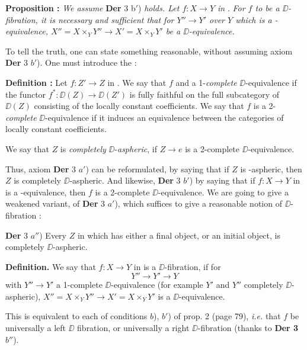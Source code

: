 \textbf{Proposition :} \textit{We assume} \textbf{Der} 3 \textup{b}$'$) \textit{holds. Let $f : X \to Y$ in} \Dia. \textit{For $f$ to be a $\DD$-fibration, it is necessary and sufficient that for $Y'' \to Y'$ over $Y$ which is a} \Hot\textit{-equivalence, $X'' = X \times_Y Y'' \to X' = X \times_Y Y'$ be a $\DD$-equivalence.}

To tell the truth, one can state something reasonable, without assuming axiom \textbf{Der} 3 $b'$). One must introduce the :

\textbf{Definition :} Let $f : Z' \to Z$ in \Dia. We say that $f$ and a 1-\textit{complete} $\DD$-equivalence if the functor $f^* : \DD(Z) \to \DD(Z')$ is fully faithful on the full subcategory of $\DD(Z)$ consisting of the locally constant coefficients. We say that $f$ is a 2-\textit{complete} $\DD$-equivalence if it induces an equivalence between the categories of locally constant coefficients. %

We say that $Z$ is \textit{completely} $\DD$-\textit{aspheric}, if $Z \to e$ is a 2-complete $\DD$-equivalence.


Thus, axiom \textbf{Der} 3 $a'$) can be reformulated, by saying that if $Z$ is \Hot-aspheric, then $Z$ is completely $\DD$-aspheric. And likewise, \textbf{Der} 3 $b'$) by saying that if $f : X \to Y$ in \Dia{} is a \Hot-equivalence, then $f$ is a 2-complete $\DD$-equivalence. We are going to give a weakened variant, of \textbf{Der} 3 $a'$), which suffices to give a reasonable notion of $\DD$-fibration :

\textbf{Der} 3 $a''$) Every $Z$ in \Dia{} which has either a final object, or an initial object, is completely $\DD$-aspheric.

\textbf{Definition.} We say that $f : X \to Y$ in \Dia{} is a $\DD$-fibration, if for
\[
Y'' \longrightarrow Y' \longrightarrow Y
\]
with $Y'' \to Y'$ a 1-complete $\DD$-equivalence (for example $Y'$ and $Y''$ completely $\DD$-aspheric), $X'' = X \times_Y Y'' \longrightarrow X' = X \times_Y Y'$ is a $\DD$-equivalence. %

This is equivalent to each of conditions $b$), $b'$) of prop. 2 (page 79), \textit{i.e.} that $f$ be universally a left $\DD$ fibration, or universally a right $\DD$-fibration (thanks to \textbf{Der 3} $b''$). %


